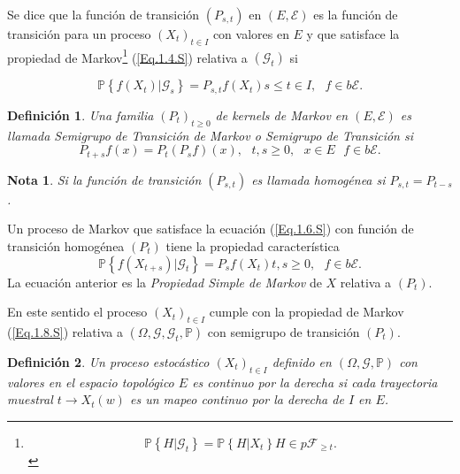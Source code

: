 \documentclass{article}
\newtheorem{Def}{Definición}[section]
\newtheorem{Note}{Nota}[section]
\newcommand{\prob}{\mathbb{P}}
\newcommand{\ER}{\left(E,\mathcal{E}\right)}
\newcommand{\KM}{\left(P_{s,t}\right)}
\newcommand{\PE}{\left(X_{t}\right)_{t\in I}}
\numberwithin{equation}{section}
\begin{document}
Se dice que la funci\'on de transici\'on $\KM$ en $\ER$ es la
funci\'on de transici\'on para un proceso $\PE$  con valores en
$E$ y que satisface la propiedad de
Markov\footnote{\begin{equation}\label{Eq.1.4.S}
\prob\left\{H|\mathcal{G}_{t}\right\}=\prob\left\{H|X_{t}\right\}\textrm{
}H\in p\mathcal{F}_{\geq t}.
\end{equation}} (\ref{Eq.1.4.S}) relativa a $\left(\mathcal{G}_{t}\right)$ si

\begin{equation}\label{Eq.1.6.S}
\prob\left\{f\left(X_{t}\right)|\mathcal{G}_{s}\right\}=P_{s,t}f\left(X_{t}\right)\textrm{
}s\leq t\in I,\textrm{ }f\in b\mathcal{E}.
\end{equation}

\begin{Def}
Una familia $\left(P_{t}\right)_{t\geq0}$ de kernels de Markov en
$\ER$ es llamada {\em Semigrupo de Transici\'on de Markov} o {\em
Semigrupo de Transici\'on} si
\[P_{t+s}f\left(x\right)=P_{t}\left(P_{s}f\right)\left(x\right),\textrm{ }t,s\geq0,\textrm{ }x\in E\textrm{ }f\in b\mathcal{E}.\]
\end{Def}
\begin{Note}
Si la funci\'on de transici\'on $\KM$ es llamada homog\'enea si
$P_{s,t}=P_{t-s}$.
\end{Note}

Un proceso de Markov que satisface la ecuaci\'on (\ref{Eq.1.6.S})
con funci\'on de transici\'on homog\'enea $\left(P_{t}\right)$
tiene la propiedad caracter\'istica
\begin{equation}\label{Eq.1.8.S}
\prob\left\{f\left(X_{t+s}\right)|\mathcal{G}_{t}\right\}=P_{s}f\left(X_{t}\right)\textrm{
}t,s\geq0,\textrm{ }f\in b\mathcal{E}.
\end{equation}
La ecuaci\'on anterior es la {\em Propiedad Simple de Markov} de
$X$ relativa a $\left(P_{t}\right)$.

En este sentido el proceso $\PE$ cumple con la propiedad de Markov
(\ref{Eq.1.8.S}) relativa a
$\left(\Omega,\mathcal{G},\mathcal{G}_{t},\prob\right)$ con
semigrupo de transici\'on $\left(P_{t}\right)$.

\begin{Def}
Un proceso estoc\'astico $\PE$ definido en
$\left(\Omega,\mathcal{G},\prob\right)$ con valores en el espacio
topol\'ogico $E$ es continuo por la derecha si cada trayectoria
muestral $t\rightarrow X_{t}\left(w\right)$ es un mapeo continuo
por la derecha de $I$ en $E$.
\end{Def}
\end{document}
